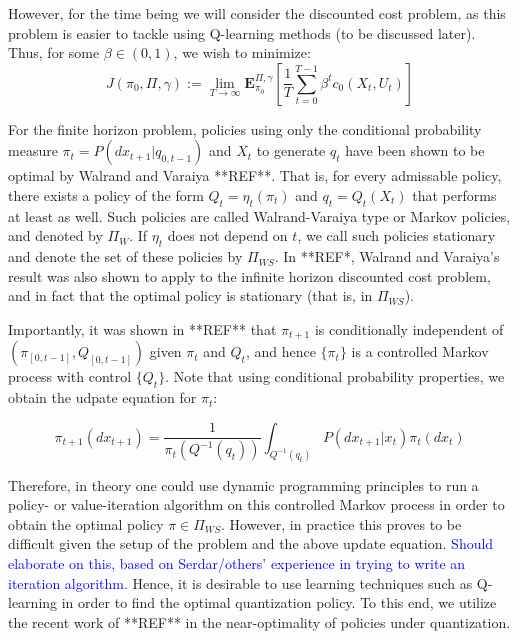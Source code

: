 \documentclass{article}
\begin{document}
However, for the time being we will consider the discounted cost problem, as this problem is easier to tackle using Q-learning methods (to be discussed later). Thus, for some \( \beta \in (0,1) \), we wish to minimize:
\[ J(\pi_0, \Pi, \gamma) := \lim_{T\to\infty}\mathbf{E}_{\pi_0}^{\Pi, \gamma}\left[\frac{1}{T}\sum_{t=0}^{T-1}\beta^t c_0(X_t,U_t)\right] \]

For the finite horizon problem, policies using only the conditional probability measure \( \pi_t = P(dx_{t+1}|q_{0,t-1}) \) and \( X_t \) to generate \( q_t \) have been shown to be optimal by Walrand and Varaiya **REF**. That is, for every admissable policy, there exists a policy of the form \( Q_t = \eta_t(\pi_t) \) and \( q_t = Q_t(X_t) \) that performs at least as well. Such policies are called Walrand-Varaiya type or Markov policies, and denoted by \( \Pi_{W} \). If \( \eta_t \) does not depend on \( t \), we call such policies stationary and denote the set of these policies by \( \Pi_{WS} \). In **REF*, Walrand and Varaiya's result was also shown to apply to the infinite horizon discounted cost problem, and in fact that the optimal policy is stationary (that is, in \( \Pi_{WS} \)).

Importantly, it was shown in **REF** that \( \pi_{t+1} \) is conditionally independent of \( (\pi_{[0,t-1]}, Q_{[0,t-1]}) \) given \( \pi_t \) and \( Q_t \), and hence \( \{\pi_t\} \) is a controlled Markov process with control \( \{Q_t\} \). Note that using conditional probability properties, we obtain the udpate equation for \( \pi_t \):

\begin{equation}
    \pi_{t+1}(dx_{t+1}) = \frac{1}{\pi_t(Q^{-1}(q_t))}\int_{Q^{-1}(q_t)}P(dx_{t+1}|x_t)\pi_t(dx_t)
\end{equation}

Therefore, in theory one could use dynamic programming principles to run a policy- or value-iteration algorithm on this controlled Markov process in order to obtain the optimal policy \( \pi \in \Pi_{WS} \). However, in practice this proves to be difficult given the setup of the problem and the above update equation. \textcolor{blue}{Should elaborate on this, based on Serdar/others' experience in trying to write an iteration algorithm.} Hence, it is desirable to use learning techniques such as Q-learning in order to find the optimal quantization policy. To this end, we utilize the recent work of **REF** in the near-optimality of policies under quantization.
\end{document}
